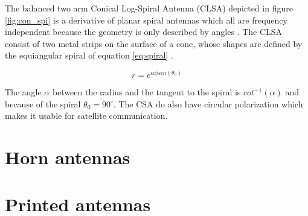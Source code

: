 The balanced two arm Conical Log-Spiral Antenna (CLSA) depicted in figure \ref{fig:con_spi} is a derivative of planar spiral antennas which all are frequency independent because the geometry is only described by angles \citep{Balanis2005}. The CLSA consist of two metal strips on the surface of a cone, whose shapes are defined by the equiangular spiral of equation \ref{eq:spiral} \citep{Rumsey1966}.

\begin{equation}
r = e^{\alpha\phi sin(\theta_0)}
\end{equation}
\label{eq:spiral} 

The angle $\alpha$ between the radius and the tangent to the spiral is $cot^{-1}(\alpha)$ and because of the spiral $\theta_0 = 90^\circ$. The CSA do also have circular polarization which makes it usable for satellite communication. 




\section{Horn antennas}
\section{Printed antennas}










    



   